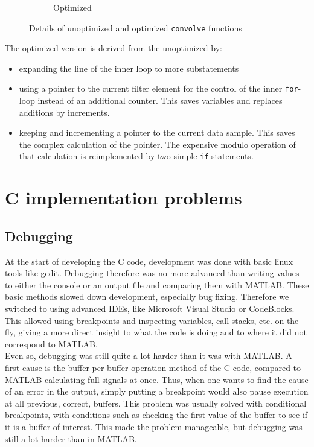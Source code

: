 \documentclass[a4paper]{article}
\begin{document}
\begin{figure}[htpb]
{\begin{subfigure}[c]{.7\textwidth}
\caption{Optimized}
\end{subfigure}
}
\caption{Details of unoptimized and optimized \texttt{convolve} functions}
\label{fig:convolvefunctions}
\end{figure}
\begin{minipage}{\textwidth}
The optimized version is derived from the unoptimized by:
\begin{itemize}
\item expanding the line of the inner loop to more substatements
\item using a pointer to the current filter element for the control of the inner \texttt{for}-loop instead of an additional counter. This saves variables and replaces additions by increments.
\item keeping and incrementing a pointer to the current data sample. This saves the complex calculation of the pointer. The expensive modulo operation of that calculation is reimplemented by two simple \texttt{if}-statements.
\end{itemize}
\end{minipage}
\section{C implementation problems}
\subsection{Debugging}
At the start of developing the C code, development was done with basic linux tools like gedit. Debugging therefore was no more advanced than writing values to either the console or an output file and comparing them with MATLAB. These basic methods slowed down development, especially bug fixing. Therefore we switched to using advanced IDEs, like Microsoft Visual Studio or CodeBlocks. This allowed using breakpoints and inspecting variables, call stacks, etc. on the fly, giving a more direct insight to what the code is doing and to where it did not correspond to MATLAB. \\

Even so, debugging was still quite a lot harder than it was with MATLAB. A first cause is the buffer per buffer operation method of the C code, compared to MATLAB calculating full signals at once. Thus, when one wants to find the cause of an error in the output, simply putting a breakpoint would also pause execution at all previous, correct, buffers. This problem was usually solved with conditional breakpoints, with conditions such as checking the first value of the buffer to see if it is a buffer of interest. This made the problem manageable, but debugging was still a lot harder than in MATLAB.\\
\end{document}
